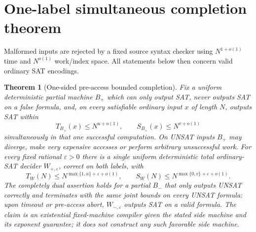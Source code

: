 \documentclass[11pt]{article}
\newtheorem{theorem}{Theorem}
\begin{document}
\section{One-label simultaneous completion theorem}
Malformed inputs are rejected by a fixed source syntax checker using
$N^{1+o(1)}$ time and $N^{o(1)}$ work/index space. All statements below
then concern valid ordinary SAT encodings.

\begin{theorem}[One-sided pre-access bounded completion]\label{th:one}
Fix a uniform deterministic \emph{partial} machine $B_+$ which
can only output SAT, never outputs SAT on a false formula,
and, on \emph{every} satisfiable ordinary input $x$ of length $N$,
outputs SAT within
\[
T_{B_+}(x)\le N^{u+o(1)},\qquad
S_{B_+}(x)\le N^{v+o(1)}
\]
\emph{simultaneously in that one successful computation}.
On UNSAT inputs $B_+$ may diverge, make very expensive accesses or
perform arbitrary unsuccessful work. For every fixed rational
$\varepsilon>0$ there is a single uniform deterministic \emph{total}
ordinary-SAT decider $W_{+,\varepsilon}$, correct on both labels, with
\[
\boxed{\
T_W(N)\le N^{\max\{1,u\}+\varepsilon+o(1)},\qquad
S_W(N)\le N^{\max\{0,v\}+\varepsilon+o(1)}.\
}\tag{1}
\]
The completely dual assertion holds for a partial $B_-$ that
only outputs UNSAT correctly and terminates with the same joint
bounds on every UNSAT formula: upon timeout or pre-access abort,
$W_{-,\varepsilon}$ outputs SAT on a valid formula.
The claim is an \emph{existential fixed-machine compiler given the
stated side machine and its exponent guarantee}; it does not
construct any such favorable side machine.
\end{theorem}
\end{document}
